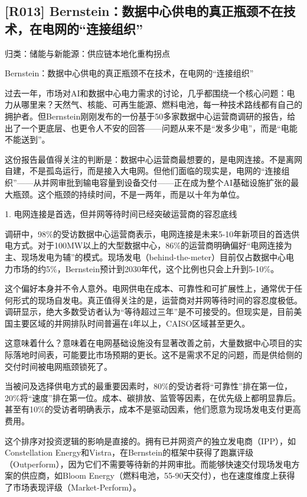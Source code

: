 \documentclass[11pt]{ctexart}
\begin{document}
\subsection{[R013] Bernstein：数据中心供电的真正瓶颈不在技术，在电网的“连接组织”}
{\small\color{refgray}归类：储能与新能源：供应链本地化重构拐点}

Bernstein：数据中心供电的真正瓶颈不在技术，在电网的“连接组织”

过去一年，市场对AI和数据中心电力需求的讨论，几乎都围绕一个核心问题：电力从哪里来？天然气、核能、可再生能源、燃料电池，每一种技术路线都有自己的拥护者。但Bernstein刚刚发布的一份基于50多家数据中心运营商调研的报告，给出了一个更底层、也更令人不安的回答——问题从来不是“发多少电”，而是“电能不能送到”。

这份报告最值得关注的判断是：数据中心运营商最想要的，是电网连接。不是离网自建，不是孤岛运行，而是接入大电网。但他们面临的现实是，电网的“连接组织”——从并网审批到输电容量到设备交付——正在成为整个AI基础设施扩张的最大瓶颈。这个瓶颈的持续时间，不是一两年，而是以十年为单位。

1. 电网连接是首选，但并网等待时间已经突破运营商的容忍底线

调研中，98\%的受访数据中心运营商表示，电网连接是未来5-10年新项目的首选供电方式。对于100MW以上的大型数据中心，86\%的运营商明确偏好“电网连接为主、现场发电为辅”的模式。现场发电（behind-the-meter）目前仅占数据中心电力市场的约5\%，Bernstein预计到2030年代，这个比例也只会上升到5-10\%。

这个偏好本身并不令人意外。电网供电在成本、可靠性和可扩展性上，通常优于任何形式的现场自发电。真正值得关注的是，运营商对并网等待时间的容忍度极低。调研显示，绝大多数受访者认为“等待超过三年”是不可接受的。但现实是，目前美国主要区域的并网排队时间普遍在4年以上，CAISO区域甚至更久。

这意味着什么？意味着在电网基础设施没有显著改善之前，大量数据中心项目的实际落地时间表，可能要比市场预期的更长。这不是需求不足的问题，而是供给侧的交付时间被电网瓶颈锁死了。

当被问及选择供电方式的最重要因素时，80\%的受访者将“可靠性”排在第一位，20\%将“速度”排在第一位。成本、碳排放、监管等因素，在优先级上都明显靠后。甚至有10\%的受访者明确表示，成本不是驱动因素，他们愿意为现场发电支付更高费用。

这个排序对投资逻辑的影响是直接的。拥有已并网资产的独立发电商（IPP），如Constellation Energy和Vistra，在Bernstein的框架中获得了跑赢评级（Outperform），因为它们不需要等待新的并网审批。而能够快速交付现场发电方案的供应商，如Bloom Energy（燃料电池，55-90天交付），也在速度维度上获得了市场表现评级（Market-Perform）。
\end{document}
